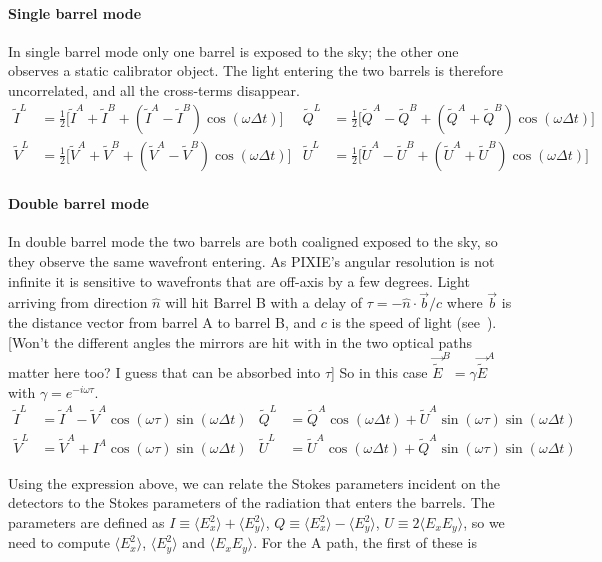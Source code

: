 \documentclass{article}
\newcommand{\I}{\tilde I}
\newcommand{\Q}{\tilde Q}
\newcommand{\U}{\tilde U}
\newcommand{\V}{\tilde V}
\newcommand{\J}{{\tilde E}}
\begin{document}
\paragraph{Single barrel mode}
In single barrel mode only one barrel is exposed to the sky; the other one
observes a static calibrator object. The light entering the two barrels is
therefore uncorrelated, and all the cross-terms disappear.
\begin{align}
	\I^L &= \frac12\big[\I^A+\I^B+(\I^A-\I^B)\cos(\omega\Delta t)\big] &
	\Q^L &= \frac12\big[\Q^A-\Q^B+(\Q^A+\Q^B)\cos(\omega\Delta t)\big] \\
	\V^L &= \frac12\big[\V^A+\V^B+(\V^A-\V^B)\cos(\omega\Delta t)\big] &
	\U^L &= \frac12\big[\U^A-\U^B+(\U^A+\U^B)\cos(\omega\Delta t)\big]
\end{align}

\paragraph{Double barrel mode}
In double barrel mode the two barrels are both coaligned exposed to the sky,
so they observe the same wavefront entering. As PIXIE's angular resolution is
not infinite it is sensitive to wavefronts that are off-axis by a few degrees.
Light arriving from direction $\hat n$ will hit Barrel B with a delay
of $\tau = -\hat n \cdot \vec b / c$ where $\vec b$ is the distance vector from
barrel A to barrel B, and $c$ is the speed of light (see~\cite{pixie_array}).
[Won't the different angles the mirrors are hit with in the two optical paths
matter here too? I guess that can be absorbed into $\tau$]
So in this case $\vec \J^B = \gamma \vec\J^A$ with $\gamma = e^{-i\omega\tau}$.
\begin{align}
	\I^L &= \I^A-\V^A\cos(\omega\tau)\sin(\omega\Delta t) &
	\Q^L &= \Q^A\cos(\omega\Delta t)+\U^A\sin(\omega\tau)\sin(\omega\Delta t) \\
	\V^L &= \V^A+I^A\cos(\omega\tau)\sin(\omega\Delta t) &
	\U^L &= \U^A\cos(\omega\Delta t)+\Q^A\sin(\omega\tau)\sin(\omega\Delta t)
\end{align}







Using the expression above, we can relate the
Stokes parameters incident on the detectors to the Stokes parameters
of the radiation that enters the barrels. The parameters are defined
as $I \equiv \langle E_x^2\rangle + \langle E_y^2\rangle$,
$Q \equiv \langle E_x^2\rangle - \langle E_y^2\rangle$,
$U \equiv 2\langle E_xE_y\rangle$, so we need to compute $\langle E_x^2\rangle$,
$\langle E_y^2\rangle$ and $\langle E_xE_y\rangle$. For the A path, the first of these is
\end{document}
